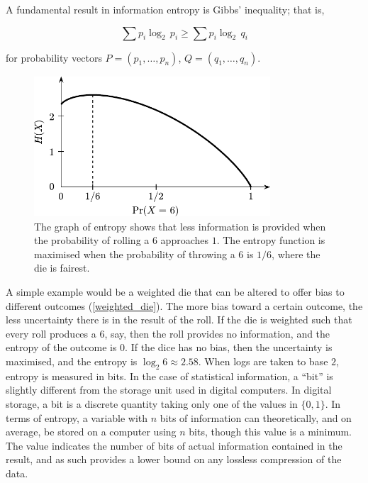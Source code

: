 A fundamental result in information entropy is Gibbs' inequality; that is,

$$
	\sum p_i \log_2 \, p_i \geq \sum p_i \log_2 \, q_i
$$

for probability vectors $P = (p_1, \dots, p_n)$, $Q = (q_1, \dots, q_n)$.

\begin{figure}[ht]
	\centering
	\includegraphics[width=250pt]{figures/weighted_die.pdf}
	\caption[Graph showing entropy of a weighted die]{The graph of entropy shows that less information is provided when the probability of rolling a $6$ approaches $1$. The entropy function is maximised when the probability of throwing a $6$ is $1/6$, where the die is fairest.}
	\label{weighted_die}
\end{figure}

A simple example would be a weighted die that can be altered to offer bias to different outcomes (\autoref{weighted_die}). The more bias toward a certain outcome, the less uncertainty there is in the result of the roll. If the die is weighted such that every roll produces a $6$, say, then the roll provides no information, and the entropy of the outcome is $0$. If the dice has no bias, then the uncertainty is maximised, and the entropy is $\log_2 6 \approx 2.58$. When logs are taken to base $2$, entropy is measured in bits. In the case of statistical information, a ``bit'' is slightly different from the storage unit used in digital computers. In digital storage, a bit is a discrete quantity taking only one of the values in $\{0, 1\}$. In terms of entropy, a variable with $n$ bits of information can theoretically, and on average, be stored on a computer using $n$ bits, though this value is a minimum. The value indicates the number of bits of actual information contained in the result, and as such provides a lower bound on any lossless compression of the data. 

